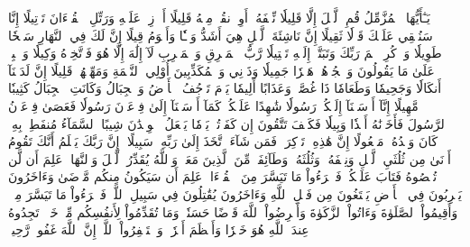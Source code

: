 يَـٰٓأَيُّهَا ٱلۡمُزَّمِّلُ
قُمِ ٱلَّيۡلَ إِلَّا قَلِيلٗا
نِّصۡفَهُۥٓ أَوِ ٱنقُصۡ مِنۡهُ قَلِيلًا
أَوۡ زِدۡ عَلَيۡهِ وَرَتِّلِ ٱلۡقُرۡءَانَ تَرۡتِيلًا
إِنَّا سَنُلۡقِي عَلَيۡكَ قَوۡلٗا ثَقِيلًا
إِنَّ نَاشِئَةَ ٱلَّيۡلِ هِيَ أَشَدُّ وَطۡـٔٗا وَأَقۡوَمُ قِيلًا
إِنَّ لَكَ فِي ٱلنَّهَارِ سَبۡحٗا طَوِيلٗا
وَٱذۡكُرِ ٱسۡمَ رَبِّكَ وَتَبَتَّلۡ إِلَيۡهِ تَبۡتِيلٗا
رَّبُّ ٱلۡمَشۡرِقِ وَٱلۡمَغۡرِبِ لَآ إِلَٰهَ إِلَّا هُوَ فَٱتَّخِذۡهُ وَكِيلٗا
وَٱصۡبِرۡ عَلَىٰ مَا يَقُولُونَ وَٱهۡجُرۡهُمۡ هَجۡرٗا جَمِيلٗا
وَذَرۡنِي وَٱلۡمُكَذِّبِينَ أُوْلِي ٱلنَّعۡمَةِ وَمَهِّلۡهُمۡ قَلِيلًا
إِنَّ لَدَيۡنَآ أَنكَالٗا وَجَحِيمٗا
وَطَعَامٗا ذَا غُصَّةٖ وَعَذَابًا أَلِيمٗا
يَوۡمَ تَرۡجُفُ ٱلۡأَرۡضُ وَٱلۡجِبَالُ وَكَانَتِ ٱلۡجِبَالُ كَثِيبٗا مَّهِيلًا
إِنَّآ أَرۡسَلۡنَآ إِلَيۡكُمۡ رَسُولٗا شَٰهِدًا عَلَيۡكُمۡ كَمَآ أَرۡسَلۡنَآ إِلَىٰ فِرۡعَوۡنَ رَسُولٗا
فَعَصَىٰ فِرۡعَوۡنُ ٱلرَّسُولَ فَأَخَذۡنَٰهُ أَخۡذٗا وَبِيلٗا
فَكَيۡفَ تَتَّقُونَ إِن كَفَرۡتُمۡ يَوۡمٗا يَجۡعَلُ ٱلۡوِلۡدَٰنَ شِيبًا
ٱلسَّمَآءُ مُنفَطِرُۢ بِهِۦۚ كَانَ وَعۡدُهُۥ مَفۡعُولًا
إِنَّ هَٰذِهِۦ تَذۡكِرَةٞۖ فَمَن شَآءَ ٱتَّخَذَ إِلَىٰ رَبِّهِۦ سَبِيلًا
۞إِنَّ رَبَّكَ يَعۡلَمُ أَنَّكَ تَقُومُ أَدۡنَىٰ مِن ثُلُثَيِ ٱلَّيۡلِ وَنِصۡفَهُۥ وَثُلُثَهُۥ وَطَآئِفَةٞ مِّنَ ٱلَّذِينَ مَعَكَۚ وَٱللَّهُ يُقَدِّرُ ٱلَّيۡلَ وَٱلنَّهَارَۚ عَلِمَ أَن لَّن تُحۡصُوهُ فَتَابَ عَلَيۡكُمۡۖ فَٱقۡرَءُواْ مَا تَيَسَّرَ مِنَ ٱلۡقُرۡءَانِۚ عَلِمَ أَن سَيَكُونُ مِنكُم مَّرۡضَىٰ وَءَاخَرُونَ يَضۡرِبُونَ فِي ٱلۡأَرۡضِ يَبۡتَغُونَ مِن فَضۡلِ ٱللَّهِ وَءَاخَرُونَ يُقَٰتِلُونَ فِي سَبِيلِ ٱللَّهِۖ فَٱقۡرَءُواْ مَا تَيَسَّرَ مِنۡهُۚ وَأَقِيمُواْ ٱلصَّلَوٰةَ وَءَاتُواْ ٱلزَّكَوٰةَ وَأَقۡرِضُواْ ٱللَّهَ قَرۡضًا حَسَنٗاۚ وَمَا تُقَدِّمُواْ لِأَنفُسِكُم مِّنۡ خَيۡرٖ تَجِدُوهُ عِندَ ٱللَّهِ هُوَ خَيۡرٗا وَأَعۡظَمَ أَجۡرٗاۚ وَٱسۡتَغۡفِرُواْ ٱللَّهَۖ إِنَّ ٱللَّهَ غَفُورٞ رَّحِيمُۢ
